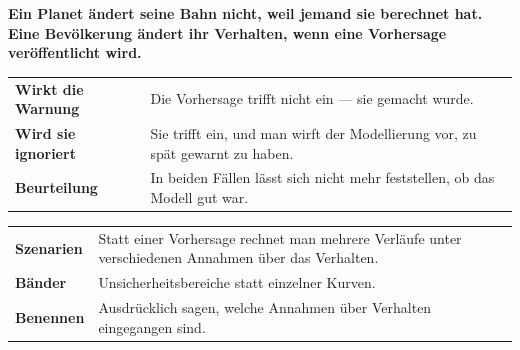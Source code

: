 \begin{merksatz}
\begin{center}
\begin{minipage}{0.9\textwidth}
\textbf{Ein Planet ändert seine Bahn nicht, weil jemand sie berechnet hat. Eine Bevölkerung ändert ihr Verhalten, wenn eine Vorhersage veröffentlicht wird.}
\end{minipage}
\end{center}

\begin{center}
{\small
\renewcommand{\arraystretch}{1.5}
\begin{tabular}{@{}P{2.8cm}P{5.8cm}@{}}
\toprule
\textbf{Wirkt die Warnung} & Die Vorhersage trifft nicht ein ---  sie gemacht wurde.\\
\textbf{Wird sie ignoriert} & Sie trifft ein, und man wirft der Modellierung vor, zu spät gewarnt zu haben.\\
\textbf{Beurteilung} & In beiden Fällen lässt sich nicht mehr feststellen, ob das Modell gut war.\\
\bottomrule
\end{tabular}}
\end{center}

\begin{center}
\begin{minipage}{0.88\textwidth}
\end{minipage}
\end{center}

\begin{center}
\renewcommand{\arraystretch}{1.5}
\begin{tabular}{@{}P{2.4cm}P{6.2cm}@{}}
\toprule
\textbf{Szenarien} & Statt einer Vorhersage rechnet man mehrere Verläufe unter verschiedenen Annahmen über das Verhalten.\\
\textbf{Bänder} & Unsicherheitsbereiche statt einzelner Kurven.\\
\textbf{Benennen} & Ausdrücklich sagen, welche Annahmen über Verhalten eingegangen sind.\\
\bottomrule
\end{tabular}
\end{center}

\begin{center}
\begin{minipage}{0.88\textwidth}
\end{minipage}
\end{center}
\end{merksatz}

